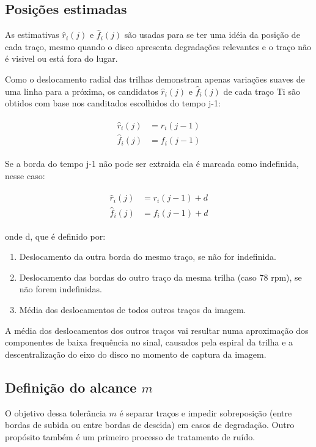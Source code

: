 \documentclass[
	12pt,				%
	openright,			%
	twoside,			%
	a4paper,			%
	english,			%
	french,				%
	spanish,			%
	brazil				%
	]{abntex2}
\newcommand{\estimr}{\hat{r}_i(j)}
\newcommand{\estimf}{\hat{f}_i(j)}
\newcommand{\func}[3]{#1_{#2}(#3)}
\begin{document}
\subsection{Posições estimadas}
As estimativas $\estimr$ e $\estimf$ são usadas para se ter uma idéia da posição de cada traço, mesmo quando o disco apresenta degradações relevantes e o traço não é visivel ou está fora do lugar.

Como o deslocamento radial das trilhas demonstram apenas variações suaves de uma linha para a próxima, os candidatos $\estimr$ e $\estimf$ de cada traço Ti são obtidos com base nos canditados escolhidos do tempo j-1:

\begin{align}\begin{split}
	\estimr &= \func{r}{i}{j-1} \\
    \estimf &= \func{f}{i}{j-1}
\end{split}\end{align}
   	
Se a borda do tempo j-1 não pode ser extraida ela é marcada como indefinida, nesse caso:

 
\begin{align}\begin{split}
	\estimr &= \func{r}{i}{j-1} + d \\
    \estimf &= \func{f}{i}{j-1} + d
\end{split}\end{align}



onde d, que é definido por:
\begin{enumerate}
\item Deslocamento da outra borda do mesmo traço, se não for indefinida.
\item Deslocamento das bordas do outro traço da mesma trilha (caso 78 rpm), se não forem indefinidas.
\item Média dos deslocamentos de todos outros traços da imagem.

\end{enumerate}
    
A média dos deslocamentos dos outros traços vai resultar numa aproximação dos componentes de baixa frequência no sinal, causados pela espiral da trilha e a descentralização do eixo do disco no momento de captura da imagem.

\subsection{Definição do alcance $m$}
O objetivo dessa tolerância $m$ é separar traços e impedir sobreposição (entre bordas de subida ou entre bordas de descida) em casos de degradação.
Outro propósito também é um primeiro processo de tratamento de ruído.
\end{document}
